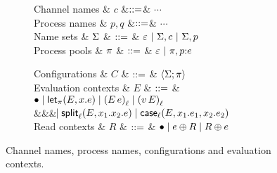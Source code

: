 \begin{figure*}[t]
\centering
\begin{subfigure}{0.35\textwidth}
\begin{grammar}
  Channel names & $c$   &$\bnfas$& $\cdots$
  \\
  Process names & $p,q$ &$\bnfas$& $\cdots$
  \\
  Name sets
  & $\Names$ 
    & $\bnfas$ & $\emptyNames ~|~ \Names, c ~|~ \Names, p$
  \\
  Process pools
  & $\Procs$ 
    & $\bnfas$ & $\emptyProcs ~|~ \Procs, p{:}\proc{e}$
\end{grammar}
\end{subfigure}%
\begin{subfigure}{0.5\textwidth}
  \begin{grammar}
  Configurations
  & $C$
     & $\bnfas$ & $\Config{\Names}{}{\Procs} $
     \\
 Evaluation contexts
  & $E$
     & $\bnfas$ & 
 $\bullet \bnfalt \eLet{x}{E}{e} \bnfalt \eApp{E}{e}{\ell} \bnfalt \eApp{v}{E}{\ell}$
\\ &&& $\bnfaltbrk \eSplitt{\ell}{E}{x_1}{x_2}{e} \bnfalt \eCase{\ell}{E}{x_1}{e_1}{x_2}{e_2}$
\\
 Read contexts
  & $R$
     & $\bnfas$ & $\bullet \bnfalt e \oplus R \bnfalt R \oplus e$
\end{grammar}
\end{subfigure}
\caption{Channel names, process names, configurations and evaluation contexts.}
\label{fig:configs}
\end{figure*}


